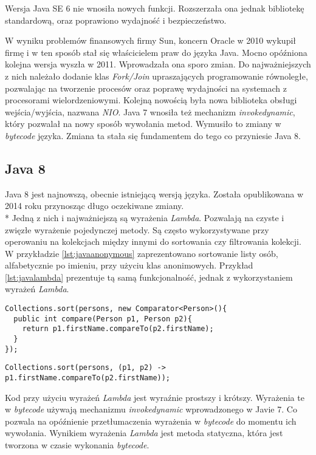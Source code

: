 Wersja Java SE 6 nie wnosiła nowych funkcji. Rozszerzała ona jednak bibliotekę standardową, oraz poprawiono wydajność i bezpieczeństwo.

W wyniku problemów finansowych firmy Sun, koncern Oracle w 2010 wykupił firmę i w ten sposób stał się właścicielem praw do języka Java. Mocno opóźniona kolejna wersja wyszła w 2011. Wprowadzała ona sporo zmian. Do najważniejszych z nich należało dodanie klas \textsl{Fork/Join} upraszających programowanie równoległe, pozwalając na tworzenie procesów oraz poprawę wydajności na systemach z procesorami wielordzeniowymi. Kolejną nowością była nowa biblioteka obsługi wejścia/wyjścia, nazwana \textsl{NIO}. Java 7 wnosiła też mechanizm \textsl{invokedynamic}, który pozwalał na nowy sposób wywołania metod. Wymusiło to zmiany w \textsl{bytecode} języka. Zmiana ta stała się fundamentem do tego co przyniesie Java 8.

\subsection{Java 8}
Java 8 jest najnowszą, obecnie istniejącą wersją języka. Została opublikowana w 2014 roku przynosząc długo oczekiwane zmiany.\\*
Jedną z nich i najważniejszą są wyrażenia \textsl{Lambda}. Pozwalają na czyste i zwięzłe wyrażenie pojedynczej metody. Są często wykorzystywane przy operowaniu na kolekcjach między innymi do sortowania czy filtrowania kolekcji. W przykładzie \ref{lst:javaanonymous} zaprezentowano sortowanie listy osób, alfabetycznie po imieniu, przy użyciu klas anonimowych. Przykład \ref{lst:javalambda} prezentuje tą samą funkcjonalność, jednak z wykorzystaniem wyrażeń \textsl{Lambda}. 

\begin{lstlisting}[caption=Sortowanie kolekcji przy użyciu klas anonimowych, label={lst:javaanonymous}]
Collections.sort(persons, new Comparator<Person>(){
  public int compare(Person p1, Person p2){
    return p1.firstName.compareTo(p2.firstName);
  }
});
\end{lstlisting}

\begin{lstlisting}[caption=Sortowanie kolekcji przy użyciu wyrażeń \textsl{Lambda}, label={lst:javalambda}, aboveskip=0mm]
Collections.sort(persons, (p1, p2) -> p1.firstName.compareTo(p2.firstName));
\end{lstlisting}
Kod przy użyciu wyrażeń \textsl{Lambda} jest wyraźnie prostszy i krótszy. Wyrażenia te w \textsl{bytecode} używają mechanizmu \textsl{invokedynamic} wprowadzonego w Javie 7. Co pozwala na opóźnienie przetłumaczenia wyrażenia w \textsl{bytecode} do momentu ich wywołania. Wynikiem wyrażenia \textsl{Lambda} jest metoda statyczna, która jest tworzona w czasie wykonania \textsl{bytecode}.

